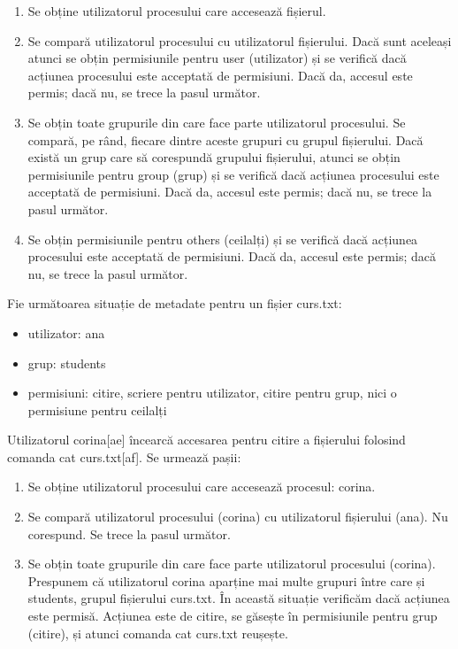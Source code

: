 \begin{enumerate}
	\item Se obține utilizatorul procesului care accesează fișierul.
	\item Se compară utilizatorul procesului cu utilizatorul fișierului.
		Dacă sunt aceleași atunci se obțin permisiunile pentru user
		(utilizator) și se verifică dacă acțiunea procesului este
		acceptată de permisiuni. Dacă da, accesul este permis; dacă nu,
		se trece la pasul următor.
	\item Se obțin toate grupurile din care face parte utilizatorul
		procesului. Se compară, pe rând, fiecare dintre aceste grupuri
		cu grupul fișierului. Dacă există un grup care să corespundă
		grupului fișierului, atunci se obțin permisiunile pentru group
		(grup) și se verifică dacă acțiunea procesului este acceptată de
		permisiuni. Dacă da, accesul este permis; dacă nu, se trece la
		pasul următor.
	\item Se obțin permisiunile pentru others (ceilalți) și se verifică dacă
		acțiunea procesului este acceptată de permisiuni. Dacă da,
		accesul este permis; dacă nu, se trece la pasul următor.
\end{enumerate}

Fie următoarea situație de metadate pentru un fișier curs.txt:

\begin{itemize}
	\item utilizator: ana
	\item grup: students
	\item permisiuni: citire, scriere pentru utilizator, citire pentru grup,
		nici o permisiune pentru ceilalți
\end{itemize}

Utilizatorul corina[ae] încearcă accesarea pentru citire a fișierului folosind
comanda cat curs.txt[af]. Se urmează pașii:

\begin{enumerate}
	\item Se obține utilizatorul procesului care accesează procesul: corina.
	\item Se compară utilizatorul procesului (corina) cu utilizatorul
		fișierului (ana). Nu corespund. Se trece la pasul următor.
	\item Se obțin toate grupurile din care face parte utilizatorul
		procesului (corina). Prespunem că utilizatorul corina aparține
		mai multe grupuri între care și students, grupul fișierului
		curs.txt. În această situație verificăm dacă acțiunea este
		permisă. Acțiunea este de citire, se găsește în permisiunile
		pentru grup (citire), și atunci comanda cat curs.txt reușește.
\end{enumerate}

